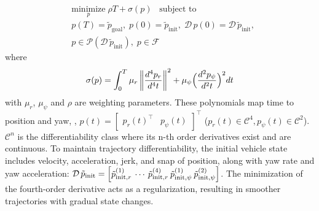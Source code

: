 \begin{equation}
\begin{aligned}
&\underset{p}{\text{minimize}} \; \rho T + \sigma\left(p\right) \;\;\; \text{subject to} \\
&p(T) = \tilde p_{\text{goal}},\; p(0) = \tilde p_{\text{init}},\; \mathcal{D\,} p(0) = \mathcal{D\,} \tilde p_{\text{init}}, \\
&p \in \mathcal{P}(\mathcal{D\,} \tilde p_{\text{init}}),\; p \in \mathcal{F}
\label{eqn:naiveminsnap}
\end{aligned}
\end{equation}
where 
\begin{equation}\label{eqn:smoothness}
\sigma(p)=\int_{0}^{T} \mu_r \left\lVert\frac{d^4 p_{r}}{d^4 t}\right\rVert^2 + \mu_\psi \Big(\frac{d^2 p_\psi}{d^2 t}\Big)^2 dt
\end{equation}
with $\mu_r$, $\mu_\psi$ and $\rho$ are weighting parameters.
These polynomials map time to position and yaw, \ie, $p(t) = \begin{bmatrix} {{}p_r(t)}^\intercal &  p_\psi(t) \end{bmatrix}^\intercal$ ($p_r(t) \in \mathcal{C}^4, p_\psi(t) \in \mathcal{C}^2$).
$\mathcal{C}^n$ is the differentiability class where its n-th order derivatives exist and are continuous.
To maintain trajectory differentiability, the initial vehicle state includes velocity, acceleration, jerk, and snap of position, along with yaw rate and yaw acceleration:
$\mathcal{D\,} \tilde p_{\text{init}} = \begin{bmatrix} \tilde p_{\text{init},r}^{(1)} \kern2pt \cdots \kern2pt \tilde p_{\text{init},r}^{(4)} \kern2pt \tilde p_{\text{init},\psi}^{(1)} \kern2pt \tilde p_{\text{init},\psi}^{(2)} \end{bmatrix}$.
The minimization of the fourth-order derivative acts as a regularization, resulting in smoother trajectories with gradual state changes. 



